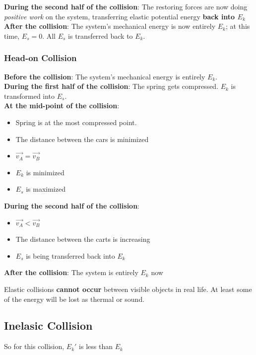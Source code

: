 \textbf{During the second half of the collision}: The restoring forces are now doing \textit{positive work} on the system, transferring 
elastic potential energy \textbf{back into $E_k$}\\

    \textbf{After the collision}: The system's mechanical energy is now entirely $E_k$; at this time, $E_s = 0$. All $E_s$ is transferred back to $E_k$. 

\subsubsection{Head-on Collision} 
    \textbf{Before the collision}: The system's mechanical energy is entirely $E_k$.\\

    \textbf{During the first half of the collision}: The spring gets compressed. $E_k$ is transformed into $E_s$.\\

\textbf{At the mid-point of the collision}: \begin{itemize}
    \item Spring is at the most compressed point.
    \item The distance between the cars is minimized
    \item $\vec{v_{A}} = \vec{v_{B}}$
    \item $E_k$ is minimized
    \item $E_s$ is maximized
\end{itemize}

\textbf{During the second half of the collision}: \begin{itemize}
    \item $\vec{v_A} < \vec{v_B}$
    \item The distance between the carts is increasing
    \item $E_s$ is being transferred back into $E_k$
\end{itemize}

\textbf{After the collision}:
The system is entirely $E_k$ now

\begin{remark}
    Elastic collisions \textbf{cannot occur} between visible objects in real life. At least some of the energy will be lost as thermal or sound. 
\end{remark}


\subsection{Inelasic Collision}
So for this collision, $E_k'$ is less than $E_k$\\

